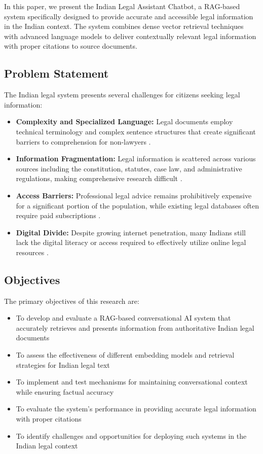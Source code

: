 \documentclass[conference]{IEEEtran}
\begin{document}
In this paper, we present the Indian Legal Assistant Chatbot, a RAG-based system specifically designed to provide accurate and accessible legal information in the Indian context. The system combines dense vector retrieval techniques with advanced language models to deliver contextually relevant legal information with proper citations to source documents.

\subsection{Problem Statement}

The Indian legal system presents several challenges for citizens seeking legal information:

\begin{itemize}
    \item \textbf{Complexity and Specialized Language:} Legal documents employ technical terminology and complex sentence structures that create significant barriers to comprehension for non-lawyers \cite{bhatia2010}.
    \item \textbf{Information Fragmentation:} Legal information is scattered across various sources including the constitution, statutes, case law, and administrative regulations, making comprehensive research difficult \cite{verma2018}.
    \item \textbf{Access Barriers:} Professional legal advice remains prohibitively expensive for a significant portion of the population, while existing legal databases often require paid subscriptions \cite{krishnan2014}.
    \item \textbf{Digital Divide:} Despite growing internet penetration, many Indians still lack the digital literacy or access required to effectively utilize online legal resources \cite{singh2020}.
\end{itemize}

\subsection{Objectives}

The primary objectives of this research are:

\begin{itemize}
    \item To develop and evaluate a RAG-based conversational AI system that accurately retrieves and presents information from authoritative Indian legal documents
    \item To assess the effectiveness of different embedding models and retrieval strategies for Indian legal text
    \item To implement and test mechanisms for maintaining conversational context while ensuring factual accuracy
    \item To evaluate the system's performance in providing accurate legal information with proper citations
    \item To identify challenges and opportunities for deploying such systems in the Indian legal context
\end{itemize}
\end{document}
